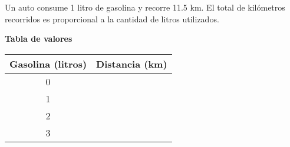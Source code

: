 
\question Un auto consume
          1 litro de gasolina y recorre 11.5 km. El total de kilómetros
          recorridos es proporcional a la cantidad de litros utilizados.

\textbf{Tabla de valores}

\begin{multicols}{2}
\begin{center}
  \begin{tabular}{|c|c|}
     \hline
     \rowcolor[HTML]{C0C0C0}
         Gasolina (litros) & Distancia (km) \\
     \hline 0 &  \\
     \hline 1 &  \\
     \hline 2 &  \\
     \hline 3 &  \\
     \hline
  \end{tabular}
\end{center}

\end{multicols}
